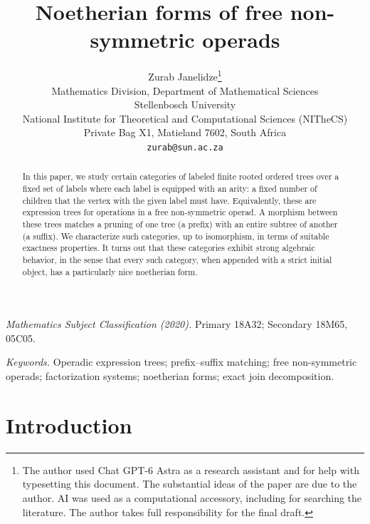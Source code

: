 \documentclass[11pt,a4paper]{article}
\title{\textbf{Noetherian forms of free non-symmetric operads}}
\author{Zurab Janelidze\thanks{%
The author used Chat GPT-6 Astra as a research assistant and
for help with typesetting this document. The substantial ideas
of the paper are due to the author. AI was used as a
computational accessory, including for searching the literature.
The author takes full responsibility for the final draft.%
}\\[4pt]
\small Mathematics Division, Department of Mathematical Sciences\\
\small Stellenbosch University\\
\small National Institute for Theoretical and Computational Sciences (NITheCS)\\
\small Private Bag X1, Matieland 7602, South Africa\\
\small\texttt{zurab@sun.ac.za}}
\date{}
\theoremstyle{plain}
\theoremstyle{definition}
\theoremstyle{remark}
\begin{document}
\maketitle
\begin{abstract}
In this paper, we study certain categories of labeled finite rooted ordered trees over a fixed set of labels where each label is equipped with an arity: a fixed number of children that the vertex with the given label must have. Equivalently, these are expression trees for operations in a free non-symmetric operad. A morphism between these trees matches a pruning of one tree (a prefix) with an entire subtree of another (a suffix). We characterize such categories, up to isomorphism, in terms of suitable exactness properties. It turns out that these categories exhibit strong algebraic behavior, in the sense that every such category, when appended with a strict initial object, has a particularly nice noetherian form.
\end{abstract}

\begin{flushleft}
\small
\textit{Mathematics Subject Classification (2020).}
Primary 18A32; Secondary 18M65, 05C05.\par
\textit{Keywords.} Operadic expression trees; prefix--suffix matching;
free non-symmetric operads; factorization systems; noetherian forms;
exact join decomposition.
\end{flushleft}

\section*{Introduction}
\end{document}
